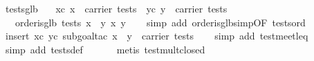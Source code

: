 \begin{isabellebody}
\endisatagproof
{\isafoldproof}%
%
\isadelimproof
\isanewline
%
\endisadelimproof
\isanewline
{}\isamarkupfalse%
\ tests{}glb{}\isanewline
\ \ \ xc{}\ {}x\ {}\ carrier\ tests{}\ \ yc{}\ {}y\ {}\ carrier\ tests{}\isanewline
\ \ \ {}order{}is{}glb\ tests\ {}x\ {}\ y{}\ {}x{}\ y{}{}\isanewline
%
\isadelimproof
\ \ %
\endisadelimproof
%
\isatagproof
{}\isamarkupfalse%
\ {}simp\ add{}\ order{}is{}glb{}simp{}OF\ tests{}ord{}{}\isanewline
\ \ \isamarkupfalse%
\ {}insert\ xc\ yc{}\ subgoal{}tac\ {}x\ {}\ y\ {}\ carrier\ tests{}{}\isanewline
\ \ \isamarkupfalse%
\ {}simp\ add{}\ test{}meet{}leq{}\isanewline
\ \ \isamarkupfalse%
\ {}simp\ add{}\ tests{}def{}\isanewline
\ \ \isamarkupfalse%
\isanewline
\ \ \isamarkupfalse%
\ {}metis\ test{}mult{}closed{}\isanewline

\end{isabellebody}
